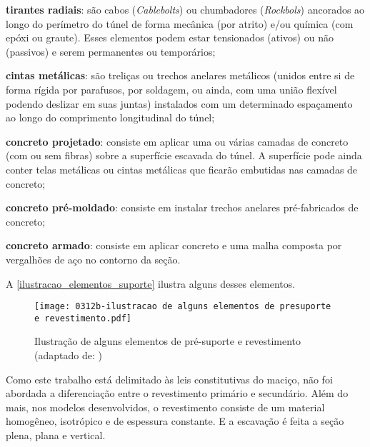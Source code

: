 \begin{alineas}
	
	\item \textbf{tirantes radiais}: são cabos (\textit{Cablebolts}) ou chumbadores (\textit{Rockbols}) ancorados ao longo do perímetro do túnel de forma mecânica (por atrito) e/ou química (com epóxi ou graute). Esses elementos podem estar tensionados (ativos) ou não (passivos) e serem permanentes ou temporários;
	
	\item \textbf{cintas metálicas}: são treliças ou trechos anelares metálicos (unidos entre si de forma rígida por parafusos, por soldagem, ou ainda, com uma união flexível podendo deslizar em suas juntas) instalados com um determinado espaçamento ao longo do comprimento longitudinal do túnel;
	
	\item \textbf{concreto projetado}: consiste em aplicar uma ou várias camadas de concreto (com ou sem fibras) sobre a superfície escavada do túnel. A superfície pode ainda conter telas metálicas ou cintas metálicas que ficarão embutidas nas camadas de concreto;
	
	\item \textbf{concreto pré-moldado}: consiste em instalar trechos anelares pré-fabricados de concreto;
	
	\item \textbf{concreto armado}: consiste em aplicar concreto e uma malha composta por vergalhões de aço no contorno da seção.
	
\end{alineas}

A \autoref{ilustracao_elementos_suporte} ilustra alguns desses elementos.

\begin{figure}[H]
	\begin{center}
		\texttt{[image: 0312b-ilustracao de alguns elementos de presuporte e revestimento.pdf]}
	\end{center}
	\caption{\label{ilustracao_elementos_suporte}Ilustração de alguns elementos de pré-suporte e revestimento (adaptado de: )}
\end{figure}

Como este trabalho está delimitado às leis constitutivas do maciço, não foi abordada a diferenciação entre o revestimento primário e secundário. Além do mais, nos modelos desenvolvidos, o revestimento consiste de um material homogêneo, isotrópico e de espessura constante. E a escavação é feita a seção plena, plana e vertical.


